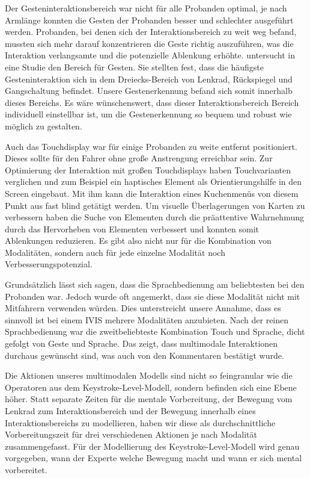 Der Gesteninteraktionsbereich war nicht für alle Probanden optimal, je nach Armlänge konnten die Gesten der Probanden besser und schlechter ausgeführt werden.
Probanden, bei denen sich der Interaktionsbereich zu weit weg befand, mussten sich mehr darauf konzentrieren die Geste richtig auszuführen, was die Interaktion verlangsamte und die potenzielle Ablenkung erhöhte.
\citet{Riener:2013:SIG} untersucht in eine Studie den Bereich für Gesten.
Sie stellten fest, dass die häufigste Gesteninteraktion sich in dem Dreiecks-Bereich von Lenkrad, Rückspiegel und Gangschaltung befindet.
Unsere Gestenerkennung befand sich somit innerhalb dieses Bereichs.
Es wäre wünschenswert, dass dieser Interaktionsbereich Bereich individuell einstellbar ist, um die Gestenerkennung so bequem und robust wie möglich zu gestalten.

Auch das Touchdisplay war für einige Probanden zu weite entfernt positioniert.
Dieses sollte für den Fahrer ohne große Anstrengung erreichbar sein.
Zur Optimierung der Interaktion mit großen Touchdisplays haben \citet{Rumelin:2013} Touchvarianten verglichen und zum Beispiel ein haptisches Element als Orientierungshilfe in den Screen eingebaut.
Mit ihm kann die Interaktion eines Kuchenmenüs von diesem Punkt aus fast blind getätigt werden.
Um visuelle Überlagerungen von Karten zu verbessern haben \citet{lee2013saliency} die Suche von Elementen durch die präattentive Wahrnehmung durch das Hervorheben von Elementen verbessert und konnten somit Ablenkungen reduzieren.
Es gibt also nicht nur für die Kombination von Modalitäten, sondern auch für jede einzelne Modalität noch Verbesserungspotenzial.

Grundsätzlich lässt sich sagen, dass die Sprachbedienung am beliebtesten bei den Probanden war.
Jedoch wurde oft angemerkt, dass sie diese Modalität nicht mit Mitfahrern verwenden würden.
Dies unterstreicht unsere Annahme, dass es sinnvoll ist bei einem IVIS mehrere Modalitäten anzubieten.
Nach der reinen Sprachbedienung war die zweitbeliebteste Kombination Touch und Sprache, dicht gefolgt von Geste und Sprache.
Das zeigt, dass multimodale Interaktionen durchaus gewünscht sind, was auch von den Kommentaren bestätigt wurde.

Die Aktionen unseres multimodalen Modells sind nicht so feingranular wie die Operatoren aus dem Keystroke-Level-Modell, sondern befinden sich eine Ebene höher.
Statt separate Zeiten für die mentale Vorbereitung, der Bewegung vom Lenkrad zum Interaktionsbereich und der Bewegung innerhalb eines Interaktionsbereichs zu modellieren, haben wir diese als durchschnittliche Vorbereitungszeit für drei verschiedenen Aktionen je nach Modalität zusammengefasst.
Für der Modellierung des Keystroke-Level-Modell wird genau vorgegeben, wann der Experte welche Bewegung macht und wann er sich mental vorbereitet.

